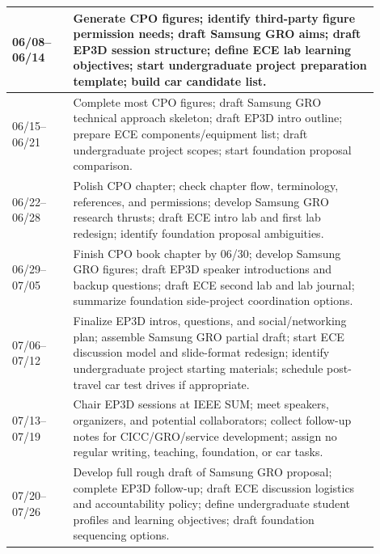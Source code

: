 \documentclass[custom, sidenote, final]{cls/oneproposal}
\begin{document}
\begin{longtable}{m{0.15\linewidth} p{0.75\linewidth}}
    06/08--06/14  &
    Generate CPO figures; identify third-party figure permission needs; draft Samsung GRO aims; draft EP3D session structure; define ECE lab learning objectives; start undergraduate project preparation template; build car candidate list.                          \\
    \midrule

    06/15--06/21  &
    Complete most CPO figures; draft Samsung GRO technical approach skeleton; draft EP3D intro outline; prepare ECE components/equipment list; draft undergraduate project scopes; start foundation proposal comparison.                                               \\
    \midrule

    06/22--06/28  &
    Polish CPO chapter; check chapter flow, terminology, references, and permissions; develop Samsung GRO research thrusts; draft ECE intro lab and first lab redesign; identify foundation proposal ambiguities.                                                      \\
    \midrule

    06/29--07/05  &
    Finish CPO book chapter by 06/30; develop Samsung GRO figures; draft EP3D speaker introductions and backup questions; draft ECE second lab and lab journal; summarize foundation side-project coordination options.                                                \\
    \midrule

    07/06--07/12  &
    Finalize EP3D intros, questions, and social/networking plan; assemble Samsung GRO partial draft; start ECE discussion model and slide-format redesign; identify undergraduate project starting materials; schedule post-travel car test drives if appropriate.     \\
    \midrule

    07/13--07/19  &
    Chair EP3D sessions at IEEE SUM; meet speakers, organizers, and potential collaborators; collect follow-up notes for CICC/GRO/service development; assign no regular writing, teaching, foundation, or car tasks.                                                  \\
    \midrule

    07/20--07/26  &
    Develop full rough draft of Samsung GRO proposal; complete EP3D follow-up; draft ECE discussion logistics and accountability policy; define undergraduate student profiles and learning objectives; draft foundation sequencing options.                           \\
    \midrule


\end{longtable}
\end{document}
